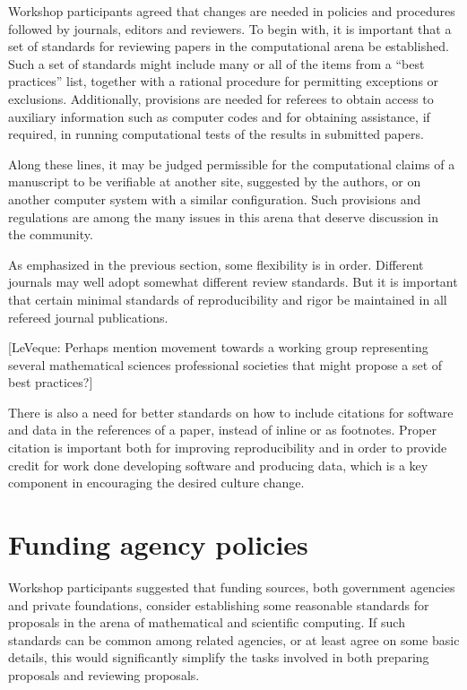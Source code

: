 \documentclass[11pt]{article}
\newcommand{\comment}[1]{{\color{blue} [#1]}}
\newcommand{\comment}[1]{}
\begin{document}
Workshop participants agreed that changes are needed in policies and
procedures followed by journals, editors and reviewers.
To begin with, it is important that a set of standards for reviewing papers
in the computational arena be established.  Such a set of standards might
include many or all of the items from a ``best practices'' list, 
together with a rational
procedure for permitting exceptions or exclusions.  Additionally, provisions
are needed for referees to obtain access to auxiliary information such as
computer codes and for obtaining assistance, if required, in running
computational tests of the results in submitted papers.

Along these lines, it may be judged permissible for  the computational
claims of a  manuscript
to be verifiable at another site, suggested by the
authors, or on another computer system with a similar configuration.  Such
provisions and regulations are among the many issues in this arena that
deserve discussion in the community.

As emphasized in the previous section, some flexibility is in order. 
Different journals may well adopt somewhat different review standards.
But it is important that certain minimal standards of reproducibility and
rigor be maintained in all refereed journal publications.

\comment{LeVeque: Perhaps mention movement towards a working group
representing several mathematical sciences professional societies
that might propose a set of best practices?}

There is also a need for better standards on how to 
include citations for software and data in the
references of a paper, instead of inline or as footnotes.
Proper citation is important both for improving reproducibility and in order
to provide credit for work done developing software and producing data,
which is a key component in encouraging the desired culture change.


\section{Funding agency policies} \label{sec:funding}

Workshop participants suggested that funding sources, both government
agencies and private foundations, consider establishing some reasonable
standards for proposals in the arena of mathematical and scientific
computing.  If such standards can be common among related agencies, or at
least agree on some basic details, this would significantly simplify the
tasks involved in both preparing proposals and reviewing proposals.
\end{document}
